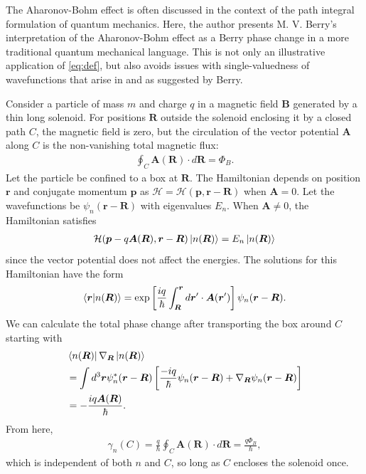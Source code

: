 \documentclass[reprint,
nofootinbib,
amsmath,amssymb,
aps]{revtex4-1}
\newcommand{\f}[2]{\frac{#1}{#2}}
\newcommand{\lb}{\left[}
\newcommand{\rb}{\right]}
\begin{document}
The Aharonov-Bohm effect is often discussed in the context of the path integral formulation of quantum mechanics.  Here, the author presents M. V. Berry's interpretation of the Aharonov-Bohm effect as a Berry phase change in a more traditional quantum mechanical language.
This is not only an illustrative application of \eqref{eq:def}, but also avoids issues with single-valuedness of wavefunctions that arise in \cite{aharonov1959significance} and \cite{ehrenberg1949refractive} as suggested by Berry. 







Consider a particle of mass $m$ and charge $q$ in a magnetic field $\bm{B}$ generated by a thin long solenoid. For positions $\bm{R}$ outside the solenoid enclosing it by a closed path $C$, the magnetic field is zero, but the circulation of the vector potential $\bm{A}$ along $C$ is the non-vanishing total magnetic flux:
\begin{align*}
\oint_C \bm{A}(\bm{R}) \cdot d\bm{R} = \Phi_B.
\end{align*}
Let the particle be confined to a box at $\bm{R}$. The Hamiltonian depends on position ${\bm{r}}$ and conjugate momentum $\bm{p}$ as $\mathcal{H} = \mathcal{H}(\bm{p}, \bm{r} - \bm{R})$ when $\bm{A} = 0$. Let the wavefunctions be $\psi_n(\bm{r} - \bm{R})$ with eigenvalues $E_n$.  When $\bm{A} \neq 0$, the Hamiltonian satisfies
\begin{align*}
\mathcal{H}(\bm{p}-q\bm{A}(\bm{R}), \bm{r}- \bm{R}) \ket{n(\bm{R})} = E_n \ket{n(\bm{R})}
\end{align*}
since the vector potential does not affect the energies. The solutions for this Hamiltonian have the form
\begin{align*}
\bra{\bm{r}} \ket{n(\bm{R})} = \exp\lb \f{iq}{\hbar} \int_{\bm{R}}^{\bm{r}} d\bm{r}'\cdot \bm{A}(\bm{r}') \rb \psi_n(\bm{r} - \bm{R}).
\end{align*}
We can calculate the total phase change after transporting the box around $C$ starting with
\begin{align*}
&\bra{n(\bm{R})} \nabla_{\bm{R}} \ket{n(\bm{R})}\\
&= \int d^3\bm{r}\psi^*_n(\bm{r} - \bm{R}) \lb \f{-iq}{\hbar}\psi_n(\bm{r} - \bm{R}) + \nabla_{\bm{R}} \psi_n(\bm{r} - \bm{R}) \rb\\
&= -\f{iq\bm{A}(\bm{R})}{\hbar}.
\end{align*}
From here,
\begin{align*}
\gamma_n(C) = \f{q}{\hbar}\oint_C \bm{A}(\bm{R}) \cdot d\bm{R} = \f{q\Phi_B}{\hbar},
\end{align*}
which is independent of both $n$ and $C$, so long as $C$ encloses the solenoid once.
\end{document}
